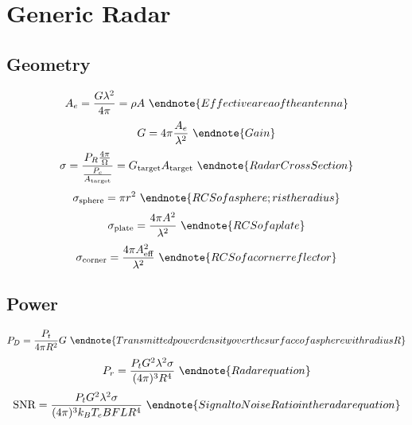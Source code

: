 \section{Generic Radar}
\subsection{Geometry}
\begin{multicols}{3} \noindent
	$$ A_e = \frac{G \lambda^2}{4 \pi} = \rho A \
		\endnote{Effective area of the antenna}
		$$
	$$ G = 4 \pi \frac{A_e}{\lambda^2} \
		\endnote{Gain}
		$$
	$$ 	\sigma =
			\frac{P_R \frac{4 \pi}{\Omega}}{\frac{P_c}{A_\text{target}}} =
			G_\text{target} A_\text{target} \
		\endnote{Radar Cross Section}
		$$
	$$ \sigma_\text{sphere} = \pi r^2 \
		\endnote{RCS of a sphere; r is the radius}
		$$
	$$ \sigma_\text{plate} = \frac{4 \pi A^2}{\lambda^2} \
		\endnote{RCS of a plate}
		$$
	$$ \sigma_\text{corner} = \frac{4 \pi A_\text{eff}^2}{\lambda^2} \
		\endnote{RCS of a corner reflector}
		$$
\end{multicols}

\subsection{Power}
\begin{multicols}{3} \noindent
	$$ P_D = \frac{P_t}{4 \pi R^2} G \
		\endnote{Transmitted power density over the surface of a sphere with radius R}
		$$
	$$ P_r = \frac{P_t G^2 \lambda^2 \sigma}{(4 \pi)^3 R^4} \
		\endnote{Radar equation}
		$$
	$$ \text{SNR} = \frac{P_t G^2 \lambda^2 \sigma}{(4 \pi)^3 k_B T_e B F L R^4} \
		\endnote{Signal to Noise Ratio in the radar equation}
		$$
\end{multicols}
\printendnotes[itemize]
